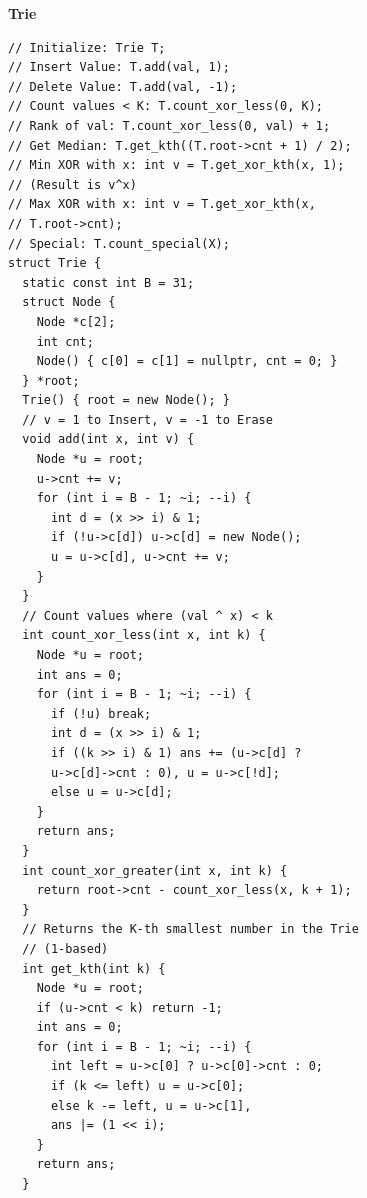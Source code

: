 \textbf{Trie}
\begin{lstlisting}
// Initialize: Trie T;
// Insert Value: T.add(val, 1);
// Delete Value: T.add(val, -1);
// Count values < K: T.count_xor_less(0, K);
// Rank of val: T.count_xor_less(0, val) + 1;
// Get Median: T.get_kth((T.root->cnt + 1) / 2);
// Min XOR with x: int v = T.get_xor_kth(x, 1);
// (Result is v^x)
// Max XOR with x: int v = T.get_xor_kth(x,
// T.root->cnt);
// Special: T.count_special(X);
struct Trie {
  static const int B = 31;
  struct Node {
    Node *c[2];
    int cnt;
    Node() { c[0] = c[1] = nullptr, cnt = 0; }
  } *root;
  Trie() { root = new Node(); }
  // v = 1 to Insert, v = -1 to Erase
  void add(int x, int v) {
    Node *u = root;
    u->cnt += v;
    for (int i = B - 1; ~i; --i) {
      int d = (x >> i) & 1;
      if (!u->c[d]) u->c[d] = new Node();
      u = u->c[d], u->cnt += v;
    }
  }
  // Count values where (val ^ x) < k
  int count_xor_less(int x, int k) {
    Node *u = root;
    int ans = 0;
    for (int i = B - 1; ~i; --i) {
      if (!u) break;
      int d = (x >> i) & 1;
      if ((k >> i) & 1) ans += (u->c[d] ?
      u->c[d]->cnt : 0), u = u->c[!d];
      else u = u->c[d];
    }
    return ans;
  }
  int count_xor_greater(int x, int k) {
    return root->cnt - count_xor_less(x, k + 1);
  }
  // Returns the K-th smallest number in the Trie
  // (1-based)
  int get_kth(int k) {
    Node *u = root;
    if (u->cnt < k) return -1;
    int ans = 0;
    for (int i = B - 1; ~i; --i) {
      int left = u->c[0] ? u->c[0]->cnt : 0;
      if (k <= left) u = u->c[0];
      else k -= left, u = u->c[1],
      ans |= (1 << i);
    }
    return ans;
  }
\end{lstlisting}

